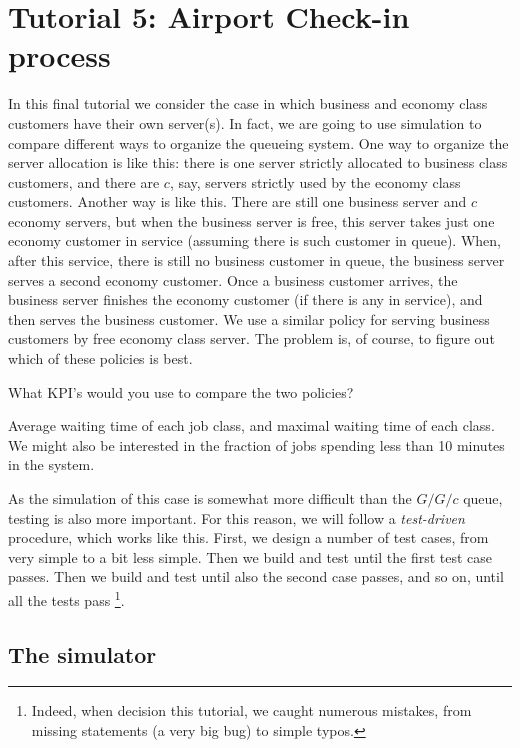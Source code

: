 \section{Tutorial 5: Airport Check-in process}
\label{sec:simul-check-proc}

In this final tutorial we consider the case in which business and economy class customers have their own server(s).
In fact, we are going to use simulation to compare different ways to organize the queueing system.
One way to organize the server allocation is like this: there is one server strictly allocated to business class customers, and there are $c$, say, servers strictly used by the economy class customers.
Another way is like this.
There are still one business server and $c$ economy servers, but when the business server is free, this server takes just one economy customer in service (assuming there is such customer in queue).
When, after this service, there is still no business customer in queue, the business server serves a second economy customer.
Once a business customer arrives, the business server finishes the economy customer (if there is any in service), and then serves the business customer.
We use a similar policy for serving business customers by free economy class server.
The problem is, of course, to figure out which of these policies is best.


\begin{exercise}
  What KPI's would you use to compare the two policies?
\begin{solution}
    Average waiting time of each job class, and maximal waiting time of each class.
    We might also be interested in the fraction of jobs spending less than 10 minutes in the system.
  \end{solution}
\end{exercise}

As the simulation of this case is somewhat more difficult than the $G/G/c$ queue, testing is also more important.
For this reason, we will follow a \emph{test-driven} procedure, which works like this.
First, we design a number of test cases, from very simple to a bit less simple.
Then we build and test until the first test case passes.
Then we build and test until also the second case passes, and so on, until all the tests pass \footnote{Indeed, when decision this tutorial, we caught numerous mistakes, from missing  statements (a very big bug) to simple typos.}.

\subsection{The simulator}
\label{sec:simulator-1}

